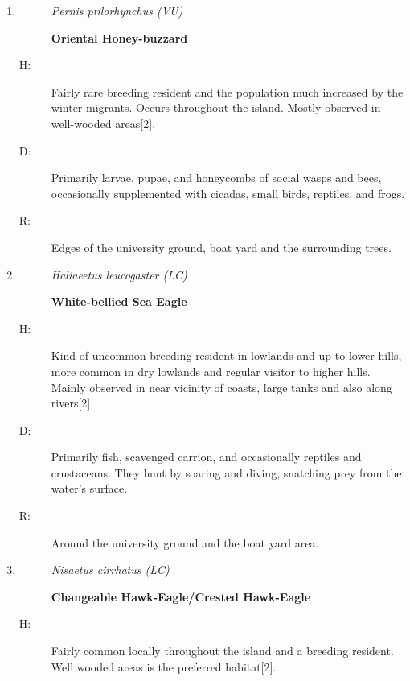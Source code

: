 \begin{itemize}
\begin{enumerate}
\begin{description}
\end{description}%
\item%
\begin{description}%
\item[]%
\textit{Pernis ptilorhynchus (VU)}%
\item[]%
\textbf{Oriental Honey-buzzard}%
\end{description}%
\begin{description}%
\item[H: ]%
Fairly rare breeding resident and the population much increased by the winter migrants. Occurs throughout the island. Mostly observed in well{-}wooded areas{[}2{]}.%
\item[D: ]%
Primarily larvae, pupae, and honeycombs of social wasps and bees, occasionally supplemented with cicadas, small birds, reptiles, and frogs.%
\item[R: ]%
Edges of the university ground, boat yard and the surrounding trees.%
\end{description}%
\item%
\begin{description}%
\item[]%
\textit{Haliaeetus leucogaster (LC)}%
\item[]%
\textbf{White{-}bellied Sea Eagle}%
\end{description}%
\begin{description}%
\item[H: ]%
Kind of uncommon breeding resident in lowlands and up to lower hills, more common in dry lowlands and regular visitor to higher hills. Mainly observed in near vicinity of coasts, large tanks and also along rivers{[}2{]}.%
\item[D: ]%
Primarily fish, scavenged carrion, and occasionally reptiles and crustaceans. They hunt by soaring and diving, snatching prey from the water's surface.%
\item[R: ]%
Around the university ground and the boat yard area.%
\end{description}%
\item%
\begin{description}%
\item[]%
\textit{Nisaetus cirrhatus (LC)}%
\item[]%
\textbf{Changeable Hawk{-}Eagle/Crested Hawk{-}Eagle}%
\end{description}%
\begin{description}%
\item[H: ]%
Fairly common locally throughout the island and a breeding resident. Well wooded areas is the preferred habitat{[}2{]}.%

\end{description}
\end{enumerate}
\end{itemize}
